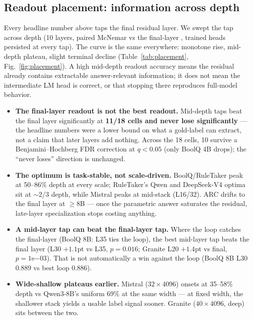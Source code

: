 \subsection{Readout placement: information across depth}
\label{sec:placement}

Every headline number above taps the final residual layer. We swept the tap
across depth (10 layers, paired McNemar vs the final-layer \head{}, trained
heads persisted at every tap). The curve is the same everywhere: monotone
rise, mid-depth plateau, slight terminal decline (Table~\ref{tab:placement},
Fig.~\ref{fig:placement}). A high mid-depth readout accuracy means the residual
already contains extractable answer-relevant information; it does not mean
the intermediate LM head is correct, or that stopping there reproduces
full-model behavior.

\begin{itemize}
\item \textbf{The final-layer readout is not the best readout.} Mid-depth taps
  beat the final layer significantly at \textbf{11/18 cells and never lose
  significantly} --- the headline numbers were a lower bound on what a
  gold-label \head{} can extract, not a claim that later layers add nothing.
  Across the 18 cells, 10 survive a Benjamini--Hochberg FDR correction at
  $q<0.05$ (only BoolQ 4B drops); the ``never loses'' direction is unchanged.
\item \textbf{The optimum is task-stable, not scale-driven.} BoolQ/RuleTaker
  peak at 50--86\% depth at every scale; RuleTaker's Qwen and DeepSeek-V4
  optima sit at $\sim$2/3 depth, while Mistral peaks at mid-stack (L16/32).
  ARC drifts to the final layer at $\ge$8B ---
  once the parametric answer saturates the residual, late-layer specialization
  stops costing anything.
\item \textbf{A mid-layer tap can beat the final-layer tap.} Where the loop
  catches the final-layer \head{} (BoolQ 8B: L35 ties the loop), the best
  mid-layer tap beats the final layer (L30 $+1.1$pt vs L35, $p=0.016$;
  Granite L20 $+1.4$pt vs final, $p=1\mathrm{e}{-03}$). That is not
  automatically a win against the loop (BoolQ 8B L30 0.889 vs best loop
  0.886).
\item \textbf{Wide-shallow plateaus earlier.} Mistral ($32{\times}4096$)
  onsets at 35--58\% depth vs Qwen3-8B's uniform 69\% at the same width --- at
  fixed width, the shallower stack yields a usable label signal sooner. Granite
  ($40{\times}4096$, deep) sits between the two.
\end{itemize}

